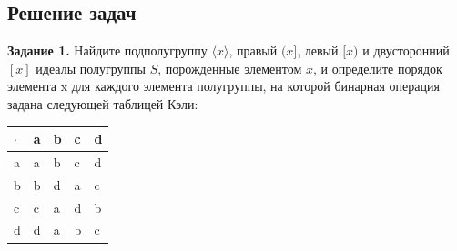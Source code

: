 \documentclass[bachelor, och, labwork]{shiza}
\begin{document}
    \subsection{Решение задач}
      \textbf{Задание 1.} Найдите подполугруппу $\langle x \rangle$, правый $(x]$, левый $[x)$ и двусторонний $[x]$ идеалы
      полугруппы $S$, порожденные элементом $x$, и определите порядок элемента x для каждого элемента полугруппы, на
      которой бинарная операция задана следующей таблицей Кэли:
        \begin{table}[H]
            \centering
            \begin{tabular}{|l|l|l|l|l|}
            \hline
            $\cdot$ & a & b & c & d \\ \hline
            a & a & b & c & d \\ \hline
            b & b & d & a & c \\ \hline
            c & c & a & d & b \\ \hline
            d & d & a & b & c \\ \hline
        \end{tabular}
        \end{table}
\end{document}
